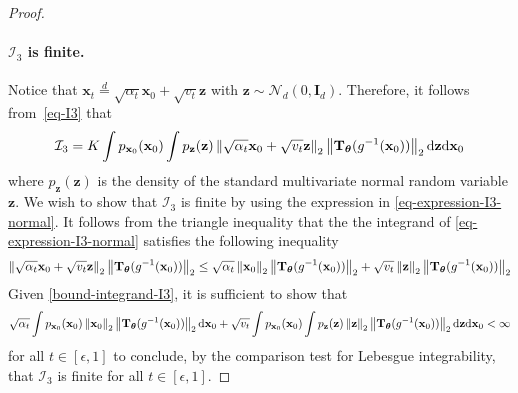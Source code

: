 \begin{proof}
\paragraph{$\mathcal{I}_{3}$ is finite.} Notice that $\mathbf{x}_{t}\overset{d}{=}\sqrt{\alpha_t}\mathbf{x}_{0} + \sqrt{v_t} \mathbf{z}$ with $\mathbf{z}\sim\mathcal{N}_{d}(0,\mathbf{I}_{d})$. Therefore, it follows from~\eqref{eq-I3} that
\begin{equation}
\label{eq-expression-I3-normal}
\mathcal{I}_{3} = K  \int p_{\mathbf{x}_0}(\mathbf{x}_0)\int  p_{\mathbf{z}}(\mathbf{z}) \left\lVert \sqrt{\alpha_t}\mathbf{x}_{0} + \sqrt{v_t} \mathbf{z} \right\rVert_2\left\lVert \mathbf{T}_{\boldsymbol{\theta}}(g^{-1}(\mathbf{x}_0)) \right\rVert_2  \mathrm{d}\mathbf{z} \mathrm{d}\mathbf{x}_0 
\end{equation}
where $p_{\mathbf{z}}(\mathbf{z})$ is the density of the standard multivariate normal random variable $\mathbf{z}$. We wish to show that $\mathcal{I}_{3}$ is finite by using the expression in \eqref{eq-expression-I3-normal}. It follows from the triangle inequality that the the integrand of \eqref{eq-expression-I3-normal} satisfies the following inequality
\begin{equation}
\label{bound-integrand-I3}
\left\lVert \sqrt{\alpha_t}\mathbf{x}_{0} + \sqrt{v_t} \mathbf{z} \right\rVert_2\left\lVert \mathbf{T}_{\boldsymbol{\theta}}(g^{-1}(\mathbf{x}_0)) \right\rVert_2  \leq \sqrt{\alpha_t}\left\lVert \mathbf{x}_{0} \right\rVert_2\left\lVert \mathbf{T}_{\boldsymbol{\theta}}(g^{-1}(\mathbf{x}_0)) \right\rVert_2  + \sqrt{v_t} \left\lVert \mathbf{z} \right\rVert_2\left\lVert \mathbf{T}_{\boldsymbol{\theta}}(g^{-1}(\mathbf{x}_0)) \right\rVert_2 
\end{equation}
Given \eqref{bound-integrand-I3}, it is sufficient to show that
\begin{equation}
\label{eq-finite-integral-bound-I3}
\sqrt{\alpha_t}\int p_{\mathbf{x}_{0}}(\mathbf{x}_{0})\left\lVert \mathbf{x}_{0} \right\rVert_2\left\lVert \mathbf{T}_{\boldsymbol{\theta}}(g^{-1}(\mathbf{x}_0)) \right\rVert_2 \mathrm{d}\mathbf{x}_{0}  + \sqrt{v_t} \int p_{\mathbf{x}_{0}}(\mathbf{x}_{0})\int p_{\mathbf{z}}(\mathbf{z})\left\lVert \mathbf{z} \right\rVert_2\left\lVert \mathbf{T}_{\boldsymbol{\theta}}(g^{-1}(\mathbf{x}_0)) \right\rVert_2 \mathrm{d}\mathbf{z}\mathrm{d}\mathbf{x}_{0} <\infty 
\end{equation}
for all $t\in[\epsilon,1]$ to conclude, by the comparison test for Lebesgue integrability, that $\mathcal{I}_{3}$ is finite for all $t\in[\epsilon,1]$.


\end{proof}
